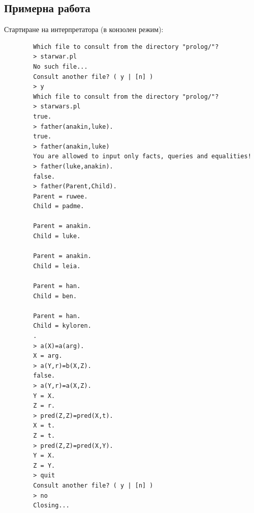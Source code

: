 \documentclass[15pt]{extarticle}
\begin{document}
	\subsection{Примерна работа}
	
	Стартиране на интерпретатора (в конзолен режим):
	
	\begin{lstlisting}
		Which file to consult from the directory "prolog/"?
		> starwar.pl
		No such file...
		Consult another file? ( y | [n] )
		> y
		Which file to consult from the directory "prolog/"?
		> starwars.pl
		true.
		> father(anakin,luke).
		true.
		> father(anakin,luke)
		You are allowed to input only facts, queries and equalities!
		> father(luke,anakin).
		false.
		> father(Parent,Child).
		Parent = ruwee.
		Child = padme.
		
		Parent = anakin.
		Child = luke.
		
		Parent = anakin.
		Child = leia.
		
		Parent = han.
		Child = ben.
		
		Parent = han.
		Child = kyloren.
		.
		> a(X)=a(arg).
		X = arg.
		> a(Y,r)=b(X,Z).
		false.
		> a(Y,r)=a(X,Z).
		Y = X.
		Z = r.
		> pred(Z,Z)=pred(X,t).
		X = t.
		Z = t.
		> pred(Z,Z)=pred(X,Y).
		Y = X.
		Z = Y.
		> quit
		Consult another file? ( y | [n] )
		> no
		Closing...
		
	\end{lstlisting}
	
	
\end{document}
